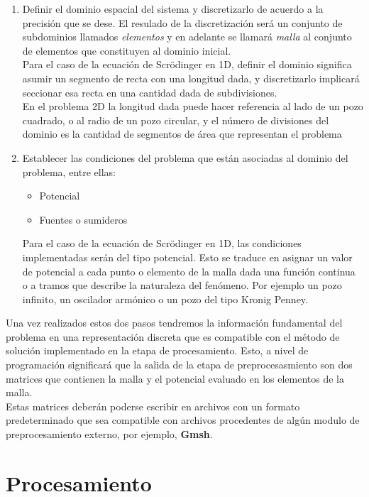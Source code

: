 \documentclass[12pt,letterpaper]{article}
\begin{document}
\begin{enumerate}

 \item Definir el dominio espacial del sistema y discretizarlo de acuerdo a la precisi\'on que se dese. El resulado de la
	discretizaci\'on ser\'a un conjunto de subdominios llamados \textit{elementos} y en adelante se llamar\'a \textit{malla} al
	conjunto de elementos que constituyen al dominio inicial.\\	Para el caso de la ecuaci\'on de Scr\"odinger en 1D, definir el
	dominio significa asumir un segmento de recta con una longitud	dada, y discretizarlo implicar\'a seccionar esa	recta en una
	cantidad dada de subdivisiones.\\
	En el problema 2D la longitud dada puede hacer referencia al lado de un pozo cuadrado, o al radio de un pozo circular, y el
	n\'umero de divisiones del dominio es la cantidad de segmentos de \'area que representan el problema 
 \item Establecer las condiciones del problema que est\'an asociadas al dominio del problema, entre ellas:
	\begin{itemize}
	\item Potencial
	\item Fuentes o sumideros
	\end{itemize}
	Para el caso de la ecuaci\'on de Scr\"odinger en 1D, las condiciones implementadas ser\'an del tipo potencial. Esto se traduce en
	asignar un valor de potencial a cada punto o elemento de la malla dada una funci\'on continua o a tramos que describe la naturaleza 
	del fen\'omeno. Por ejemplo un pozo infinito, un oscilador arm\'onico o un pozo del tipo Kronig Penney.   
\end{enumerate}

Una vez realizados estos dos pasos tendremos la informaci\'on fundamental del problema en una representaci\'on discreta que es compatible
con el m\'etodo de soluci\'on implementado en la etapa de procesamiento. Esto, a nivel de programaci\'on significar\'a que la salida de la
etapa de preprocesasmiento son dos matrices que contienen la malla y el potencial evaluado en los elementos de la malla.\\

Estas matrices deber\'an poderse escribir en archivos con un formato predeterminado que sea compatible con archivos procedentes de alg\'un
modulo de preprocesamiento externo, por ejemplo, \textbf{Gmsh}.  
 
\section{Procesamiento}
\end{document}
